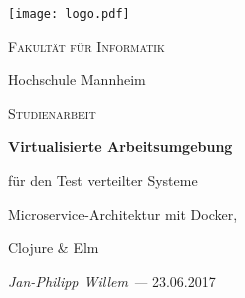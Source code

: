 \begin{titlepage}
{\texttt{[image: logo.pdf]}}\par
\vspace{4cm}
{\scshape\LARGE Fakultät für Informatik \par Hochschule Mannheim\par}
\vspace{0.66cm}
{\scshape\Large Studienarbeit\par}
\vspace{.033cm}
{\huge\bfseries Virtualisierte Arbeitsumgebung\par für den Test verteilter Systeme\par}
{\LARGE Microservice-Architektur mit Docker,\par Clojure \& Elm\par}
\vspace{0.66cm}
{\Large\itshape Jan-Philipp Willem ---}
\vspace{.1cm}
{\Large 23.06.2017}
\vfill
\end{titlepage}
